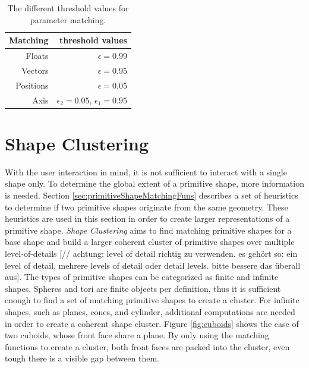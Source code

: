 \begin{table}
\centering
\begin{tabular}{ r | r }
    Matching    & threshold values \\
    \hline
  Floats         & $\epsilon = 0.99$ \\
    Vectors     & $\epsilon = 0.95$ \\
  Positions & $\epsilon = 0.05$ \\ 
    Axis             & $\epsilon_2 = 0.05$, $\epsilon_1 = 0.95$ \\  

\end{tabular}
\caption[Different threshold values for parameter matching]
{The different threshold values for parameter matching.}
\label{tab:matchingThresholds}
\end{table}


\section{Shape Clustering}
\label{sec:shapeClustering}

With the user interaction in mind, it is not sufficient to interact with a single shape only. To determine the global extent of a primitive shape, more information is needed. Section \ref{sec:primitiveShapeMatchingFuns} describes a set of heuristics to determine if two primitive shapes originate from the same geometry. These heuristics are used in this section in order to create larger representations of a primitive shape. 
\textit{Shape Clustering} aims to find matching primitive shapes for a base shape and build a larger coherent cluster of primitive shapes over multiple level-of-details [// achtung: level of detail richtig zu verwenden. es gehört so: ein level of detail, mehrere levels of detail oder detail levels. bitte bessere das überall aus]. The types of primitive shapes can be categorized as finite and infinite shapes. Spheres and tori are finite objects per definition, thus it is sufficient enough to find a set of matching primitive shapes to create a cluster. For infinite shapes, such as planes, cones, and cylinder, additional computations are needed in order to create a coherent shape cluster. Figure \ref{fig:cuboids} shows the case of two cuboids, whose front face share a plane. By only using the matching functions to create a cluster, both front faces are packed into the cluster, even tough there is a visible gap between them.

